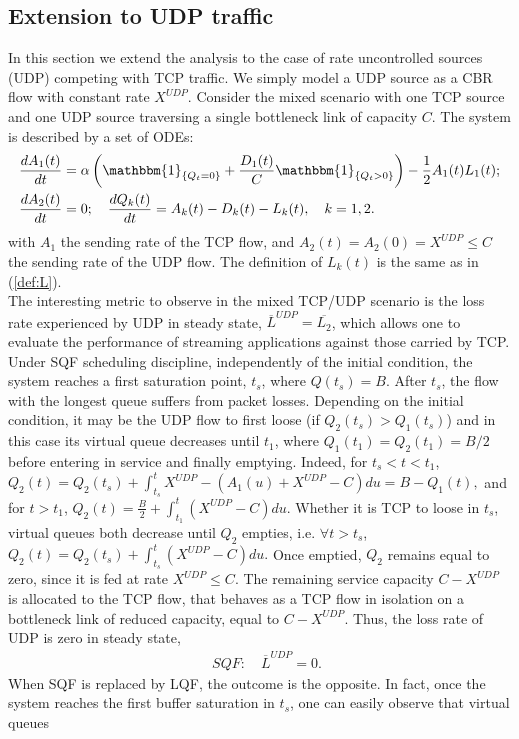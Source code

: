 \documentclass[a4paper,oneside, 11pt]{article}
\newcommand{\I}[1]{  \mathbbm{1}_{ \left\{  #1 \right\} }   }
\begin{document}
\subsection{Extension to UDP traffic}\label{sec:UDP}
In this section we extend the analysis to the case of rate uncontrolled sources (UDP)
competing with TCP traffic. We simply model a UDP source as a CBR flow
with constant rate $X^{UDP}$.
Consider the mixed scenario with one TCP source and one UDP source traversing a single bottleneck link
of capacity $C$. The system is described by a set of ODEs:\begin{align}\label{ODE_TCP-UDP}
&\frac{dA_1(t)}{dt} =\alpha\left(\I{Q_t=0}+
\frac{D_1(t)}{C}\I{Q_t>0}\right)-\frac{1}{2}A_1(t)L_1(t);  \\
&\frac{dA_2(t)}{dt}=0;\quad \frac{dQ_k(t)}{dt}=A_k(t)-D_k(t)-L_k(t), \quad k=1,2.
\nonumber
\end{align}
with $A_1$ the sending rate of the TCP flow, and $A_2(t)=A_2(0)=X^{UDP}\le C$ the sending rate of the UDP flow.
The definition of $L_k(t)$ is the same as in (\ref{def:L}).\\
The interesting metric to observe in the mixed TCP/UDP	 scenario is the loss rate experienced by UDP in steady state, $\overline{L}^{UDP}=\overline{L_2}$,
which allows one to evaluate the performance of streaming applications against those carried by TCP.\\
Under SQF scheduling discipline, independently of the initial condition, the system reaches a first saturation point, $t_s$, where $Q(t_s)=B$. After $t_s$, the flow with the longest queue suffers from packet losses. Depending on the initial condition, it may be the UDP flow to first loose (if $Q_2(t_s)>Q_1(t_s)$) and in this case its virtual queue decreases until $t_1$, where $Q_1(t_1)=Q_2(t_1)=B/2$ before entering in service and finally emptying.
Indeed, for $t_s<t<t_1$,
$ Q_2(t)=Q_2(t_s)+\int_{t_s}^{t} X^{UDP}-(A_1(u)+X^{UDP}-C)du = B-Q_1(t),$
and for $t>t_1$,
$ Q_2(t)=\frac{B}{2}+\int_{t_1}^t (X^{UDP}-C) du.$
Whether it is TCP to loose in $t_s$, virtual queues both decrease until $Q_2$ empties, i.e. $\forall t>t_s$,
$Q_2(t)=Q_2(t_s)+\int_{t_s}^t (X^{UDP}-C) du.$
Once emptied, $Q_2$ remains equal to zero, since it is fed at rate $X^{UDP}\leq C$.
The remaining service capacity $C-X^{UDP}$ is allocated to the TCP flow, that behaves as a TCP flow in isolation on a bottleneck link of reduced capacity, equal to $C-X^{UDP}$.
Thus, the loss rate of UDP is zero in steady state,\begin{align}\label{Loss_rate_UDP_SQF}
 \quad SQF: \quad\overline{L}^{UDP}=0.
\end{align}When SQF is replaced by LQF, the outcome is the opposite. In fact, once the system reaches the first buffer saturation in $t_s$, one can easily observe that virtual queues
\end{document}
